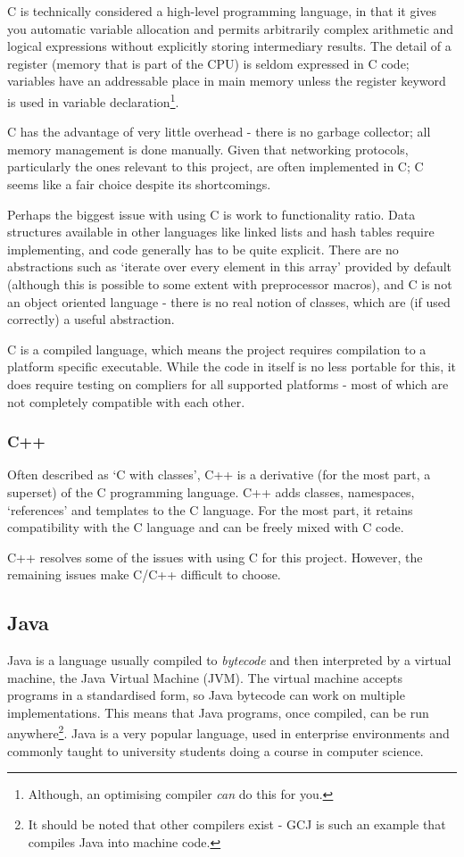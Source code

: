 \documentclass[10pt,a4paper,notitlepage]{report}
\begin{document}
C is technically considered a high-level programming language, in that it gives you automatic variable allocation and permits arbitrarily complex arithmetic and logical expressions without explicitly storing intermediary results. The detail of a register (memory that is part of the CPU) is seldom expressed in C code; variables have an addressable place in main memory unless the register keyword is used in variable declaration\footnote{Although, an optimising compiler \emph{can} do this for you.}.

C has the advantage of very little overhead - there is no garbage collector; all memory management is done manually. Given that networking protocols, particularly the ones relevant to this project, are often implemented in C; C seems like a fair choice despite its shortcomings.

Perhaps the biggest issue with using C is work to functionality ratio. Data structures available in other languages like linked lists and hash tables require implementing, and code generally has to be quite explicit. There are no abstractions such as `iterate over every element in this array' provided by default (although this is possible to some extent with preprocessor macros), and C is not an object oriented language - there is no real notion of classes, which are (if used correctly) a useful abstraction.

C is a compiled language, which means the project requires compilation to a platform specific executable. While the code in itself is no less portable for this, it does require testing on compliers for all supported platforms - most of which are not completely compatible with each other.

\subsubsection{C++}
Often described as `C with classes', C++ is a derivative (for the most part, a superset) of the C programming language\cite{tcpppl}.
C++ adds classes, namespaces, `references' and templates to the C language. For the most part, it retains compatibility with the C language and can be freely mixed with C code.

C++ resolves some of the issues with using C for this project. However, the remaining issues make C/C++ difficult to choose.

\subsection{Java}
Java is a language usually compiled to \emph{bytecode} and then interpreted by a virtual machine, the Java Virtual Machine (JVM). The virtual machine accepts programs in a standardised form, so Java bytecode can work on multiple implementations. This means that Java programs, once compiled, can be run anywhere\footnote{It should be noted that other compilers exist - GCJ\cite{gcj} is such an example that compiles Java into machine code.}. Java is a very popular language\cite{javatech}, used in enterprise environments and commonly taught to university students doing a course in computer science.
\end{document}
